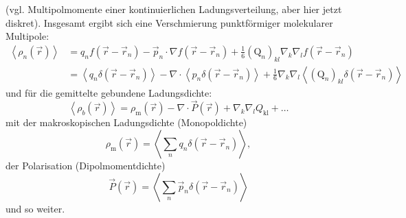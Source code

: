 (vgl. Multipolmomente einer kontinuierlichen Ladungsverteilung, aber hier jetzt diskret). Insgesamt ergibt sich eine Verschmierung punktförmiger molekularer Multipole:
\begin{align*}
	\left\langle \rho _{n}\left(\vec {r}\right)\right\rangle & =q_{n}f\left(\vec {r}-\vec {r}_{n}\right)-\vec {p}_{n}\cdot \nabla f\left(\vec {r}-\vec {r}_{n}\right)+\frac{1}{6}\left(\mathrm{Q}_{n}\right)_{kl}\nabla _{k}\nabla _{l}f\left(\vec {r}-\vec {r}_{n}\right) \\&=\left\langle q_{n}\delta \left(\vec {r}-\vec {r}_{n}\right)\right\rangle -\nabla \cdot \left\langle p_{n}\delta \left(\vec {r}-\vec {r}_{n}\right)\right\rangle +\frac{1}{6}\nabla _{k}\nabla _{l}\left\langle \left(\mathrm{Q}_{n}\right)_{kl}\delta \left(\vec {r}-\vec {r}_{n}\right)\right\rangle
\end{align*}
und für die gemittelte gebundene Ladungsdichte:
\begin{equation*}
	\left\langle \rho _{b}\left(\vec {r}\right)\right\rangle =\rho _{\mathrm{m}}\left(\vec {r}\right)-\nabla \cdot \vec {P}\left(\vec {r}\right)+\nabla _{k}\nabla _{l}{Q}_{\mathrm{kl}}+\ldots
\end{equation*}
mit der makroskopischen Ladungsdichte (Monopoldichte)
\begin{equation*}
	\rho _{\mathrm{m}}\left(\vec {r}\right)=\left\langle \sum _{n}q_{n}\delta \left(\vec {r}-\vec {r}_{n}\right)\right\rangle ,
\end{equation*}
der Polarisation (Dipolmomentdichte)
\begin{equation*}
	\vec {P}\left(\vec {r}\right)=\left\langle \sum _{n}\vec {p}_{n}\delta \left(\vec {r}-\vec {r}_{n}\right)\right\rangle
\end{equation*}
und so weiter.


